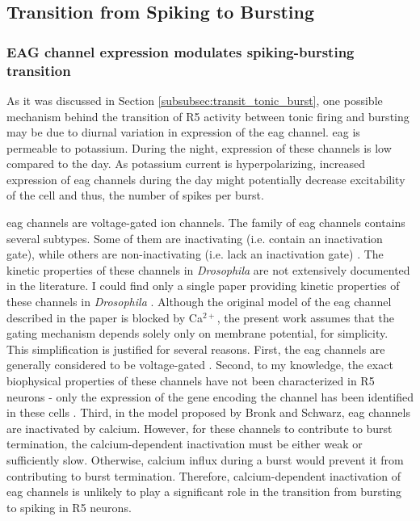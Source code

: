 \documentclass[../main.tex]{subfiles}
\begin{document}
\subsection{Transition from Spiking to Bursting}

\subsubsection{EAG channel expression modulates spiking-bursting transition}

\noindent As it was discussed in Section \ref{subsubsec:transit_tonic_burst}, one possible mechanism behind the transition of R5 activity between tonic firing and bursting may be due to diurnal variation in expression of the \gls{eag} channel. \gls{eag} is permeable to potassium. During the night, expression of these channels is low compared to the day. %
As potassium current is hyperpolarizing, increased expression of \gls{eag} channels during the day might potentially decrease excitability of the cell and thus, the number of spikes per burst.

\gls{eag} channels are voltage-gated ion channels. The family of \gls{eag} channels contains several subtypes. Some of them are inactivating (i.e. contain an inactivation gate), while others are non-inactivating (i.e. lack an inactivation gate) \parencite{bauerEtheragogoChannelsEffective2018}.
The kinetic properties of these channels in \textit{Drosophila} are not extensively documented in the literature. I could find only a single paper providing kinetic properties of these channels in \textit{Drosophila} \parencite{bronkRegulationEagCa22018}. Although the original model of the \gls{eag} channel described in the paper is blocked by Ca$^{2+}$, the present work assumes that the gating mechanism depends solely only on membrane potential, for simplicity. This simplification is justified for several reasons. First, the \gls{eag} channels are generally considered to be voltage-gated \parencite{bauerEtheragogoChannelsEffective2018}. Second, to my knowledge, the exact biophysical properties of these channels have not been characterized in R5 neurons - only the expression of the gene encoding the channel has been identified in these cells \parencite{doppSinglecellTranscriptomicsReveals2024}. Third, in the model proposed by Bronk and Schwarz, \gls{eag} channels are inactivated by calcium. However, for these channels to contribute to burst termination, the calcium-dependent inactivation must be either weak or sufficiently slow. Otherwise, calcium influx during a burst would prevent it from contributing to burst termination.
Therefore, calcium-dependent inactivation of \gls{eag} channels is unlikely to play a significant role in the transition from bursting to spiking in R5 neurons.
\end{document}
